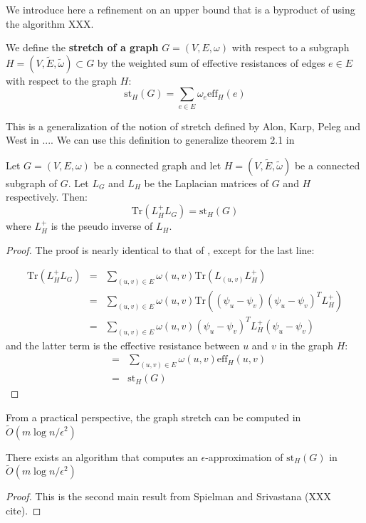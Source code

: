 We introduce here a refinement on an upper bound that is a byproduct
of using the algorithm XXX. \begin{definition} We define the \textbf{stretch
of a graph} $G=\left(V,E,\omega\right)$ with respect to a subgraph
$H=\left(V,\tilde{E},\tilde{\omega}\right)\subset G$ by the weighted
sum of effective resistances of edges $e\in E$ with respect to the
graph $H$: 
\[
\text{st}_{H}\left(G\right)=\sum_{e\in E}\omega_{e}\text{eff}_{H}\left(e\right)
\]


\end{definition} This is a generalization of the notion of stretch
defined by Alon, Karp, Peleg and West in .... We can use this definition
to generalize theorem 2.1 in \cite{Spielman2009b} \begin{theorem}
Let $G=\left(V,E,\omega\right)$ be a connected graph and let $H=\left(V,\tilde{E},\tilde{\omega}\right)$
be a connected subgraph of $G$. Let $L_{G}$ and $L_{H}$ be the
Laplacian matrices of $G$ and $H$ respectively. Then: 
\[
\text{Tr}\left(L_{H}^{+}L_{G}\right)=\text{st}_{H}\left(G\right)
\]
where $L_{H}^{+}$ is the pseudo inverse of $L_{H}$.\end{theorem}
\begin{proof} The proof is nearly identical to that of \cite{Spielman2009b},
except for the last line:

\begin{eqnarray*}
\text{Tr}\left(L_{H}^{+}L_{G}\right) & = & \sum_{\left(u,v\right)\in E}\omega\left(u,v\right)\text{Tr}\left(L_{\left(u,v\right)}L_{H}^{+}\right)\\
 & = & \sum_{\left(u,v\right)\in E}\omega\left(u,v\right)\text{Tr}\left(\left(\psi_{u}-\psi_{v}\right)\left(\psi_{u}-\psi_{v}\right)^{T}L_{H}^{+}\right)\\
 & = & \sum_{\left(u,v\right)\in E}\omega\left(u,v\right)\left(\psi_{u}-\psi_{v}\right)^{T}L_{H}^{+}\left(\psi_{u}-\psi_{v}\right)
\end{eqnarray*}
and the latter term is the effective resistance between $u$ and $v$
in the graph $H$: 
\begin{eqnarray*}
 & = & \sum_{\left(u,v\right)\in E}\omega\left(u,v\right)\text{eff}_{H}\left(u,v\right)\\
 & = & \text{st}_{H}\left(G\right)
\end{eqnarray*}


\end{proof} From a practical perspective, the graph stretch can be
computed in $\tilde{O}\left(m\log n/\epsilon^{2}\right)$ \begin{proposition}
There exists an algorithm that computes an $\epsilon$-approximation
of $\text{st}_{H}\left(G\right)$ in $\tilde{O}\left(m\log n/\epsilon^{2}\right)$\end{proposition}
\begin{proof} This is the second main result from Spielman and Srivastana
(XXX cite). \end{proof}
